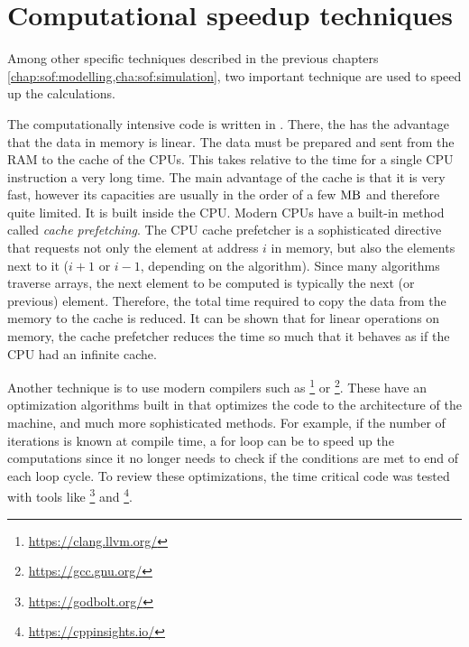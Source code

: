 \section{Computational speedup techniques}\label{sec:theorySpeedup}
%
Among other specific techniques described in the previous chapters \cref{chap:sof:modelling,cha:sof:simulation}, two important technique are used to speed up the calculations.
\par
%
The computationally intensive code is written in \cpp{}.
There, the  has the advantage that the data in memory is linear.
The data must be prepared and sent from the \ac{RAM} to the cache of the \acp{CPU}.
This takes relative to the time for a single \ac{CPU} instruction a very long time.
The main advantage of the cache is that it is very fast, however its capacities are usually in the order of a few $\si{\mega\byte}$ and therefore quite limited.
It is built inside the \ac{CPU}.
Modern \acp{CPU} have a built-in method called \textit{cache prefetching}.
The \ac{CPU} cache prefetcher is a sophisticated directive that requests not only the element at address $i$ in memory, but also the elements next to it ($i+1$ or $i-1$, depending on the algorithm).
Since many algorithms traverse arrays, the next element to be computed is typically the next (or previous) element.
Therefore, the total time required to copy the data from the memory to the cache is reduced.
It can be shown that for linear operations on memory, the cache prefetcher reduces the time so much that it behaves as if the \ac{CPU} had an infinite cache.
\par
%
Another technique is to use modern compilers such as \footnote{\url{https://clang.llvm.org/}} or \footnote{\url{https://gcc.gnu.org/}}.
These have an optimization algorithms built in that optimizes the code to the architecture of the machine, and much more sophisticated methods.
For example, if the number of iterations is known at compile time, a for loop can be  to speed up the computations since it no longer needs to check if the conditions are met to end of each loop cycle.
To review these optimizations, the time critical code was tested with tools like \footnote{\url{https://godbolt.org/}} and \footnote{\url{https://cppinsights.io/}}.
%